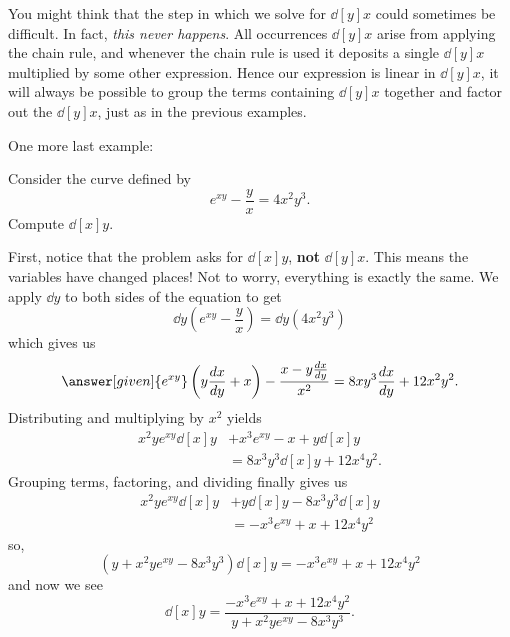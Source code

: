 \documentclass{ximera}
\begin{document}
\begin{example}
\begin{explanation}
\begin{image}
\end{image}
\end{explanation}

\end{example}


You might think that the step in which we solve for $\dd[y]{x}$ could
sometimes be difficult. In fact, \textit{this never happens}. All
occurrences $\dd[y]{x}$ arise from applying the chain rule, and
whenever the chain rule is used it deposits a single $\dd[y]{x}$
multiplied by some other expression. Hence our expression is linear in
$\dd[y]{x}$, it will always be possible to group the terms containing
$\dd[y]{x}$ together and factor out the $\dd[y]{x}$, just as in the
previous examples.

One more last example:

\begin{example}
Consider the curve defined by
\[
e^{xy} - \frac{y}{x} = 4x^2 y^3.
\]
Compute $\dd[x]{y}$.
\begin{explanation}
First, notice that the problem asks for $\dd[x]{y}$, \textbf{not}
$\dd[y]{x}$. This
means the variables have changed places!  Not to worry, everything is
exactly the same.  We apply $\dd{y}$ to both sides of the equation to
get
\[
\dd{y} \left( e^{xy} - \frac{y}{x} \right) = \dd{y} (4x^2 y^3)
\]
which gives us
\[
\answer[given]{e^{xy}} \left(y \dd[x]{y} + x \right) - \frac{x - y \dd[x]{y}}{x^2}
= 8xy^3 \dd[x]{y} + 12 x^2 y^2.
\]
Distributing and multiplying by $x^2$ yields
\begin{align*}
  x^2 y e^{xy} \dd[x]{y} &+ x^3 e^{xy} - x + y \dd[x]{y}\\
  &= 8x^3y^3 \dd[x]{y} + 12x^4y^2.
\end{align*}
Grouping terms, factoring, and dividing finally gives us
\begin{align*}
  x^2 y e^{xy} \dd[x]{y} &+ y \dd[x]{y} - 8x^3y^3 \dd[x]{y} \\
  &= -x^3 e^{xy} + x + 12x^4 y^2
\end{align*}
so,
\[
\left( y + x^2ye^{xy} - 8x^3 y^3 \right) \dd[x]{y} = -x^3 e^{xy} + x + 12x^4 y^2 
\]
and now we see
\[
\dd[x]{y} = \frac{-x^3 e^{xy} + x + 12x^4 y^2}{y + x^2ye^{xy} - 8x^3 y^3}.
\]
\end{explanation}
\end{example}
\end{document}
